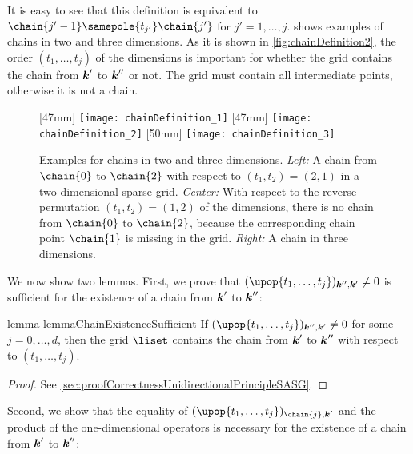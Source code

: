 It is easy to see that this definition is equivalent to
$\chain{j'-1} \samepole{t_{j'}} \chain{j'}$ for $j' = 1, \dotsc, j$.
 shows examples of chains in
two and three dimensions.
As it is shown in \cref{fig:chainDefinition2},
the order $(t_1, \dotsc, t_j)$ of the dimensions is important
for whether the grid contains the chain from ${\boldsymbol{k}}'$ to ${\boldsymbol{k}}''$ or not.
The grid must contain all intermediate points, otherwise
it is not a chain.

\begin{figure}
  [47mm]{%
    \texttt{[image: chainDefinition\_1]}%
  }%
  \hfill%
  [47mm]{%
    \texttt{[image: chainDefinition\_2]}%
  }%
  \hfill%
  [50mm]{%
    \texttt{[image: chainDefinition\_3]}%
  }%
  \caption[%
    Examples for the definition of chains%
  ]{%
    Examples for chains in two and three dimensions.
    \emph{Left:} A chain from $\chain{0}$ to $\chain{2}$
    with respect to $(t_1, t_2) = (2, 1)$ in a two-dimensional sparse grid.
    \emph{Center:}
    With respect to the reverse permutation
    $(t_1, t_2) = (1, 2)$ of the dimensions,
    there is no chain from $\chain{0}$ to $\chain{2}$,
    because the corresponding chain point $\chain{1}$ is missing in the grid.
    \emph{Right:} A chain in three dimensions.%
  }%
  \label{fig:chainDefinition}%
\end{figure}

We now show two lemmas.
First, we prove that $(\upop{t_1,\dotsc,t_j})_{\*k'',\*k'} \not= 0$
is sufficient for the existence of a chain from ${\boldsymbol{k}}'$ to ${\boldsymbol{k}}''$:

\begin{restatable}{%
  lemma%
}{%
  lemmaChainExistenceSufficient%
}
  \label{lemma:chainExistenceSufficient}
  If $(\upop{t_1,\dotsc,t_j})_{\*k'',\*k'} \not= 0$
  for some $j = 0, \dotsc, d$,
  then the grid $\liset$ contains the chain from ${\boldsymbol{k}}'$ to ${\boldsymbol{k}}''$
  with respect to $(t_1, \dotsc, t_j)$.
\end{restatable}

\begin{proof}
  See \cref{sec:proofCorrectnessUnidirectionalPrincipleSASG}.
\end{proof}

Second, we show that the equality of
$(\upop{t_1,\dotsc,t_j})_{\chain{j},\*k'}$ and the product of
the one-dimensional operators is necessary for the
existence of a chain from ${\boldsymbol{k}}'$ to ${\boldsymbol{k}}''$:

